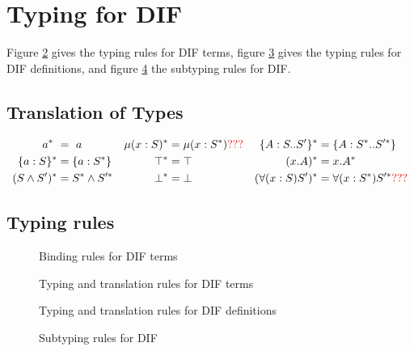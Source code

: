 \section{Typing for DIF}
Figure \ref{typing_rules_terms} gives the typing rules for DIF terms, figure
\ref{typing_rules_definitions} gives the typing rules for DIF definitions, and
figure \ref{subtyping_rules} the subtyping rules for DIF.

\subsection{Translation of Types}

\begin{DEFINITION}
    \label{TransTy}
    \begin{align*}
        a^{*} \                     &= \ a
            & \mu(x : S)^{*}        &= \mu(x : S^{*}){\color{red} ???}
            & \{A : S .. S'\}^{*}   &= \{A : S^{*} .. S'^{*}\} \\
        \{a : S\}^{*}             &= \{a : S^{*}\}
            & \top^{*}              &= \top
            & (x.A)^{*}             &= x.A^{*}                     \\
        (S \wedge S')^{*}           &= S^{*} \wedge S'^{*}
            & \bot^{*}              &= \bot
            & (\forall(x:S)S')^{*} &= \forall(x:S^{*})S'^{*}
                {\color{red} ???} \\
    \end{align*}
\end{DEFINITION}

\subsection{Typing rules}

\begin{figure}[h]
    
    \caption{Binding rules for DIF terms}
    \label{binding_rules}
\end{figure}

\begin{figure}[h]
    
    \caption{Typing and translation rules for DIF terms}
    \label{typing_rules_terms}
\end{figure}

\begin{figure}[h]
    
    \caption{Typing and translation rules for DIF definitions}
    \label{typing_rules_definitions}
\end{figure}

\begin{figure}[h]
    
    \caption{Subtyping rules for DIF}
    \label{subtyping_rules}
\end{figure}
